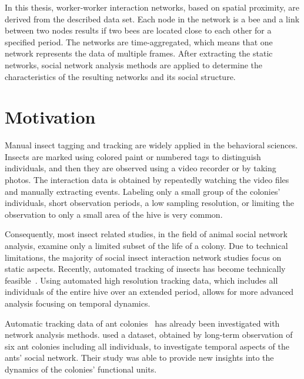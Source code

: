 In this thesis, worker-worker interaction networks, based on spatial proximity, are derived from the described data set. Each node in the network is a bee and a link between two nodes results if two bees are located close to each other for a specified period.
The networks are time-aggregated, which means that one network represents the data of multiple frames.
After extracting the static networks, social network analysis methods are applied to determine the characteristics of the resulting networks and its social structure.

\section{Motivation}
\label{sec:intro:motivation}
Manual insect tagging and tracking are widely applied in the behavioral sciences.
Insects are marked using colored paint or numbered tags to distinguish individuals, and then they are observed using a video recorder or by taking photos.
The interaction data is obtained by repeatedly watching the video files and manually extracting events.
Labeling only a small group of the colonies’ individuals, short observation periods, a low sampling resolution, or limiting the observation to only a small area of the hive is very common.

Consequently, most insect related studies, in the field of animal social network analysis, examine only a limited subset of the life of a colony.
Due to technical limitations, the majority of social insect interaction network studies focus on static aspects.
Recently, automated tracking of insects has become technically feasible~\cite{wario2015automatic, crall2015beetag, fiala2005comparing}.
Using automated high resolution tracking data, which includes all individuals of the entire hive over an extended period, allows for more advanced analysis focusing on temporal dynamics.

Automatic tracking data of ant colonies~\cite{mersch2013tracking}
has already been investigated with network analysis methods.
\textcite{mersch2013tracking} used a dataset, obtained by long-term observation of six ant colonies including all individuals, to investigate temporal aspects
of the ants’ social network.
Their study was able to provide new insights into the dynamics of the colonies’ functional units.

